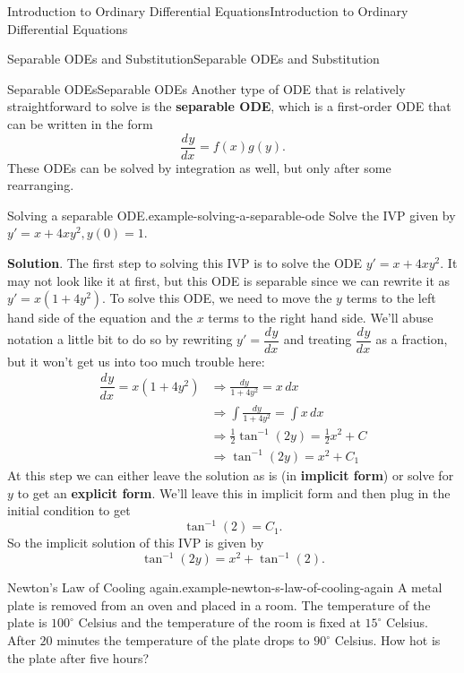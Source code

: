 \documentclass[10pt,]{book}
\newcommand{\terminology}[1]{\textbf{#1}}
\numberwithin{equation}{section}
\newcommand{\dv}[3][]{\dfrac{d^{#1} #2}{d #3^{#1}}}
\begin{document}
\begin{chapterptx}{Introduction to Ordinary Differential Equations}{}{Introduction to Ordinary Differential Equations}{}{}
\begin{sectionptx}{Separable ODEs and Substitution}{}{Separable ODEs and Substitution}{}{}
\begin{subsectionptx}{Separable ODEs}{}{Separable ODEs}{}{}
Another type of ODE that is relatively straightforward to solve is the \terminology{separable ODE}, which is a first-order ODE that can be written in the form%
%
\begin{equation*}
\dv{y}{x} = f(x)g(y).
\end{equation*}
\hypertarget{p-53}{}%
These ODEs can be solved by integration as well, but only after some rearranging.%
\begin{example}{Solving a separable ODE.}{example-solving-a-separable-ode}%
\hypertarget{p-54}{}%
Solve the IVP given by \(y' = x+4xy^{2}, y(0)=1\).%
\par\smallskip%
\noindent\textbf{Solution}.\hypertarget{solution-9}{}\quad%
\hypertarget{p-55}{}%
The first step to solving this IVP is to solve the ODE \(y' = x+4xy^{2}\). It may not look like it at first, but this ODE is separable since we can rewrite it as \(y' = x(1+4y^{2})\). To solve this ODE, we need to move the \(y\) terms to the left hand side of the equation and the \(x\) terms to the right hand side. We'll abuse notation a little bit to do so by rewriting \(y' = \dv{y}{x}\) and treating \(\dv{y}{x}\) as a fraction, but it won't get us into too much trouble here:%
%
\begin{align*}
\dv{y}{x} = x(1+4y^{2}) &\Rightarrow \frac{dy}{1+4y^{2}} = x\,dx \\
&\Rightarrow \int\frac{dy}{1+4y^{2}}  = \int x\,dx \\
&\Rightarrow \frac{1}{2}\tan^{-1}(2y)  = \frac{1}{2}x^{2}+C \\
&\Rightarrow \tan^{-1}(2y)  = x^{2}+C_{1} 
\end{align*}
\hypertarget{p-56}{}%
At this step we can either leave the solution as is (in \terminology{implicit form}) or solve for \(y\) to get an \terminology{explicit form}. We'll leave this in implicit form and then plug in the initial condition to get%
\begin{equation*}
\tan^{-1}(2) = C_{1}.
\end{equation*}
So the implicit solution of this IVP is given by%
\begin{equation*}
\tan^{-1}(2y) = x^{2}+\tan^{-1}(2).
\end{equation*}
%
\end{example}
\begin{example}{Newton's Law of Cooling again.}{example-newton-s-law-of-cooling-again}%
\hypertarget{p-57}{}%
A metal plate is removed from an oven and placed in a room. The temperature of the plate is \(100^{\circ}\) Celsius and the temperature of the room is fixed at \(15^{\circ}\) Celsius. After \(20\) minutes the temperature of the plate drops to \(90^{\circ}\) Celsius. How hot is the plate after five hours?%

\end{example}
\end{subsectionptx}
\end{sectionptx}
\end{chapterptx}
\end{document}

